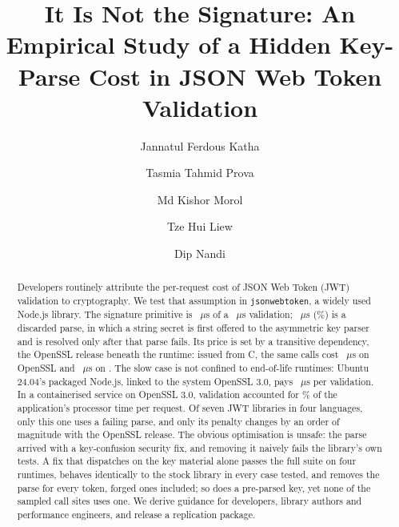 \documentclass[preprint,12pt,authoryear]{elsarticle}
\newcommand{\LibraryName}{\texttt{jsonwebtoken}}
\begin{document}
\begin{frontmatter}

\title{It Is Not the Signature: An Empirical Study of a Hidden Key-Parse Cost
in JSON Web Token Validation}

\author[bup,elite]{Jannatul Ferdous Katha}
\author[bubt,elite]{Tasmia Tahmid Prova}
\author[elite]{Md Kishor Morol}
\author[mmu]{Tze Hui Liew}
\author[elite,aiub]{Dip Nandi}



\begin{abstract}
Developers routinely attribute the per-request cost of JSON Web Token (JWT)
validation to cryptography. We test that assumption in \LibraryName{}, a widely
used Node.js library. The signature primitive is \HostHmacString~$\mu$s of a
\HostJwtString~$\mu$s validation; \HostProbeThrows~$\mu$s
(\HostProbeShareOfCall\%) is a discarded parse, in which a string
secret is first offered to the asymmetric key parser and is resolved only after
that parse fails. Its price is set by a transitive dependency, the OpenSSL
release beneath the runtime: issued from C, the same calls cost
\CFullVThreeZeroSixteen~$\mu$s on OpenSSL \CVersionLiteralVThreeZeroSixteen{}
and \CFullVThreeFiveEight~$\mu$s on \CVersionLiteralVThreeFiveEight. The slow
case is not confined to end-of-life runtimes: Ubuntu 24.04's packaged Node.js,
linked to the system OpenSSL 3.0, pays \DistroUbuntuPenalty~$\mu$s per
validation. In a containerised service on OpenSSL 3.0, validation accounted for
\AbCpuShareOfRequestPct\% of the application's processor time per request. Of
seven JWT libraries in four languages, only this one uses a failing parse, and
only its penalty changes by an order of magnitude with the OpenSSL release. The obvious optimisation is
unsafe: the parse arrived with a key-confusion security fix, and removing it
naively fails the library's own tests. A fix that dispatches on the key material
alone passes the full suite on four runtimes, behaves identically to the stock
library in every case tested, and removes the parse for every token, forged
ones included; so does a pre-parsed key, yet none of the \SampleCallSites{}
sampled call sites uses one. We derive guidance for developers, library authors
and performance engineers, and release a replication package.
\end{abstract}


\end{frontmatter}
\end{document}
